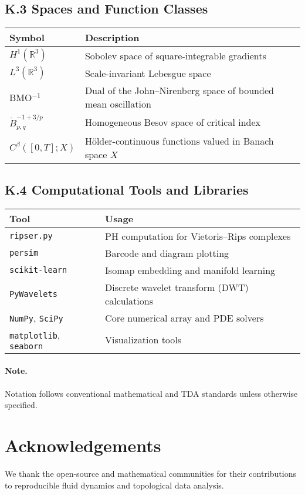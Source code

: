 \documentclass[11pt]{article}
\theoremstyle{definition}
\begin{document}
\subsection*{K.3 Spaces and Function Classes}
\begin{tabular}{ll}
\textbf{Symbol} & \textbf{Description} \\
\hline
$H^1(\mathbb{R}^3)$ & Sobolev space of square-integrable gradients \\
$L^3(\mathbb{R}^3)$ & Scale-invariant Lebesgue space \\
BMO$^{-1}$ & Dual of the John--Nirenberg space of bounded mean oscillation \\
$\dot{B}^{-1+3/p}_{p,q}$ & Homogeneous Besov space of critical index \\
$C^\beta([0,T];X)$ & Hölder-continuous functions valued in Banach space $X$ \\
\end{tabular}

\subsection*{K.4 Computational Tools and Libraries}
\begin{tabular}{ll}
\textbf{Tool} & \textbf{Usage} \\
\hline
\texttt{ripser.py} & PH computation for Vietoris--Rips complexes \\
\texttt{persim} & Barcode and diagram plotting \\
\texttt{scikit-learn} & Isomap embedding and manifold learning \\
\texttt{PyWavelets} & Discrete wavelet transform (DWT) calculations \\
\texttt{NumPy}, \texttt{SciPy} & Core numerical array and PDE solvers \\
\texttt{matplotlib}, \texttt{seaborn} & Visualization tools \\
\end{tabular}

\paragraph{Note.} Notation follows conventional mathematical and TDA standards unless otherwise specified.


\section*{Acknowledgements}
We thank the open-source and mathematical communities for their contributions to reproducible fluid dynamics and topological data analysis.
\end{document}
